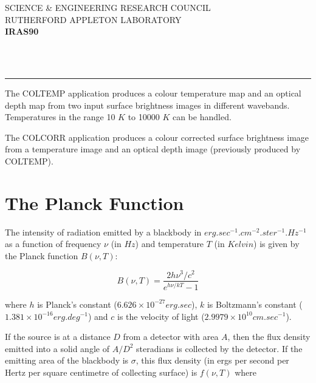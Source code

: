 \thispagestyle{empty}
SCIENCE \& ENGINEERING RESEARCH COUNCIL \hfill \stardocname\\
RUTHERFORD APPLETON LABORATORY\\
{\large\bf IRAS90\\}
{\large\bf \stardoccategory\ \stardocnumber}
\begin{flushright}
\stardocauthors\\
\stardocdate
\end{flushright}
\vspace{-4mm}
\rule{\textwidth}{0.5mm}
\vspace{5mm}
\begin{center}
{\Large\bf \stardoctitle}
\end{center}
\vspace{5mm}
\setlength{\parskip}{0mm} \tableofcontents
\setlength{\parskip}{\medskipamount} \markright{\stardocname}
\vspace{1cm}

The {\small COLTEMP} application produces a colour temperature map and an 
optical depth map from two input surface brightness images in different
wavebands. Temperatures in the range 10 $K$ to 10000 $K$ can be handled.

The {\small COLCORR} application produces a colour corrected surface brightness 
image from a temperature image and an optical depth image (previously produced 
by {\small COLTEMP}).

\section{The Planck Function}

The intensity of radiation emitted by a blackbody in
$erg.sec^{-1}.cm^{-2}.ster^{-1}.Hz^{-1}$ as a function of frequency $\nu$ (in
$Hz$) and temperature $T$ (in $Kelvin$) is given by the Planck function
$B(\nu,T)$: 

\begin{equation}
\label{EQ:BB}
B( \nu, T ) = \frac{2h\nu^{3}/c^{2}}{e^{h\nu/kT}-1}
\end{equation}

where $h$ is Planck's constant ($6.626\times 10^{-27} erg.sec$), $k$ is
Boltzmann's constant ($1.381\times 10^{-16} erg.deg^{-1}$) and $c$ is the
velocity of light ($2.9979\times 10^{10} cm.sec^{-1}$). 

If the source is at a distance $D$ from a detector with area $A$, then the flux
density emitted into a solid angle of $A/D^{2}$ steradians is collected by the
detector. If the emitting area of the blackbody is $\sigma$, this flux density
(in ergs per second per Hertz per square centimetre of collecting surface) is
$f(\nu,T)$ where 

